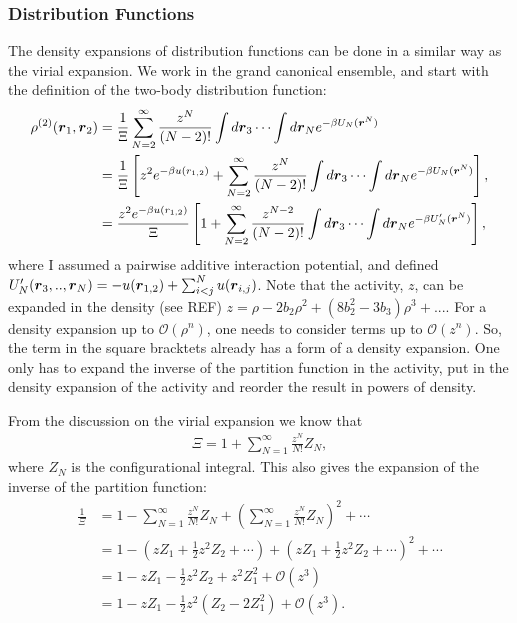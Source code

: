 \subsubsection{Distribution Functions}
The density expansions of distribution functions can be done in a similar way as the virial expansion.
We work in the grand canonical ensemble, and start with the 
definition of the two-body distribution function:
\begin{align}
\rho^{(2)} (\boldsymbol{r}_1,\boldsymbol{r}_2) &= \frac{1}{\Xi} \sum_{N=2}^\infty
    \frac{z^N}{(N-2)!} \int d\boldsymbol{r}_3 \cdots \int d\boldsymbol{r}_N
    e^{-\beta U_N(\boldsymbol{r}^N)}\\
&= \frac{1}{\Xi} \left[ z^2 e^{-\beta u(r_{1,2})} +
  \sum_{N=2}^\infty \frac{z^N}{(N-2)!} \int d\boldsymbol{r}_3 \cdots \int d\boldsymbol{r}_N
    e^{-\beta U_N(\boldsymbol{r}^N)} \right],\\
&=  \frac{z^2 e^{-\beta u(r_{1,2})}}{\Xi} \left[ 1 +
  \sum_{N=2}^\infty \frac{z^{N-2}}{(N-2)!} \int d\boldsymbol{r}_3 \cdots \int d\boldsymbol{r}_N
    e^{-\beta U'_N(\boldsymbol{r}^N)} \right],
\label{eq:rho2_exp1}
\end{align}
where I assumed a pairwise additive interaction potential, and defined $U'_N(\boldsymbol{r}_3,..,\boldsymbol{r}_N) = -u(\boldsymbol{r}_{1,2}) + \sum_{i<j}^N
u(\boldsymbol{r}_{i,j})$.
Note that the activity, $z$, can be expanded in the density (see REF) $z = \rho -2b_2 \rho^2 +(8b_2^2 - 3b_3) \rho^3 + ...$.
For a density expansion up to $\mathcal{O}(\rho^n)$,
one needs to consider terms up to $\mathcal{O}(z^n)$.
So, the term in the square bracktets already has a form of a density expansion.
One only has to expand the inverse of the partition function in the activity, put in the density expansion of the activity and reorder the result in powers of density.

From the discussion on the virial expansion  we know that
\begin{align}
\Xi = 1 + \sum_{N=1}^{\infty} \frac{z^N}{N!} Z_N,
\end{align}
where $Z_N$ is the configurational integral.
This also gives the expansion of the inverse of the partition function:
\begin{align}
\frac{1}{\Xi} &= 1 - \sum_{N=1}^{\infty} \frac{z^N}{N!} Z_N +
    \left( \sum_{N=1}^{\infty} \frac{z^N}{N!} Z_N \right)^2 + \cdots \\
&= 1 - \left( z Z_1 + \frac{1}{2} z^2 Z_2 + \cdots \right) +
    \left(z Z_1 + \frac{1}{2} z^2 Z_2 + \cdots \right)^2 + \cdots \\
&= 1 - zZ_1  - \frac{1}{2} z^2 Z_2 + z^2 Z_1^2 + \mathcal{O}(z^3) \\
&= 1 - z Z_1 - \frac{1}{2} z^2 \left( Z_2 - 2 Z_1^2 \right) +
    \mathcal{O}(z^3).
\label{eq:xi_exp}
\end{align}

